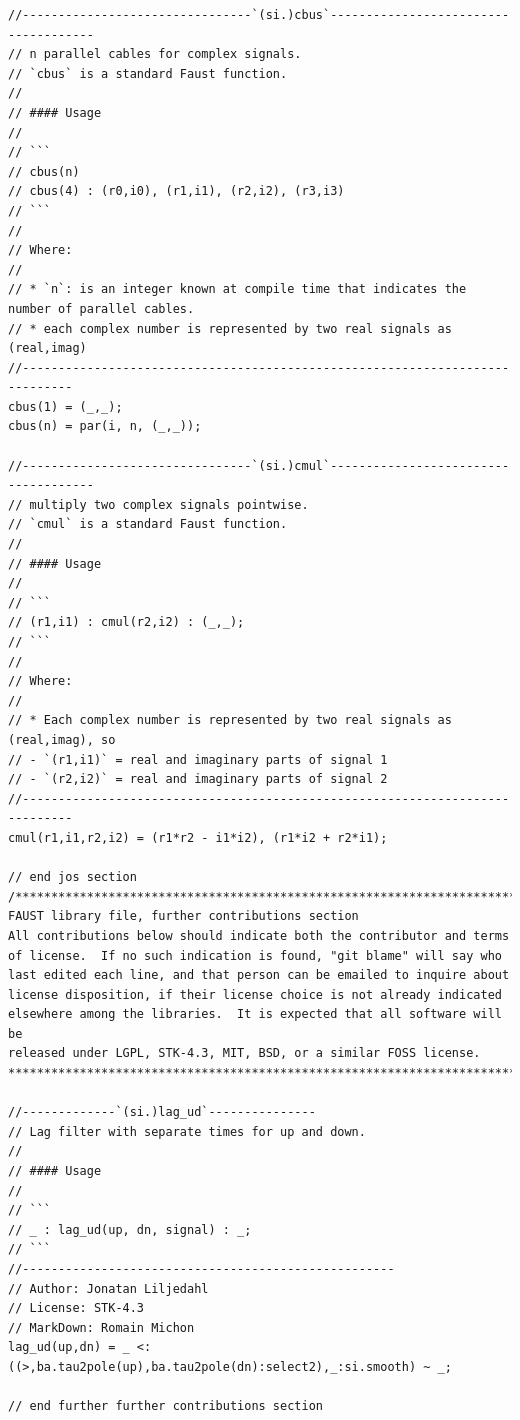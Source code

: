 \documentclass{article}
\begin{document}
\begin{lstlisting}[caption=\texttt{signals.lib}]
//--------------------------------`(si.)cbus`-------------------------------------
// n parallel cables for complex signals.
// `cbus` is a standard Faust function.
//
// #### Usage
//
// ```
// cbus(n)
// cbus(4) : (r0,i0), (r1,i1), (r2,i2), (r3,i3)
// ```
//
// Where:
//
// * `n`: is an integer known at compile time that indicates the number of parallel cables.
// * each complex number is represented by two real signals as (real,imag)
//-----------------------------------------------------------------------------
cbus(1) = (_,_);
cbus(n) = par(i, n, (_,_));

//--------------------------------`(si.)cmul`-------------------------------------
// multiply two complex signals pointwise.
// `cmul` is a standard Faust function.
//
// #### Usage
//
// ```
// (r1,i1) : cmul(r2,i2) : (_,_);
// ```
//
// Where:
//
// * Each complex number is represented by two real signals as (real,imag), so
// - `(r1,i1)` = real and imaginary parts of signal 1
// - `(r2,i2)` = real and imaginary parts of signal 2
//-----------------------------------------------------------------------------
cmul(r1,i1,r2,i2) = (r1*r2 - i1*i2), (r1*i2 + r2*i1);

// end jos section
/************************************************************************
FAUST library file, further contributions section
All contributions below should indicate both the contributor and terms
of license.  If no such indication is found, "git blame" will say who
last edited each line, and that person can be emailed to inquire about
license disposition, if their license choice is not already indicated
elsewhere among the libraries.  It is expected that all software will be
released under LGPL, STK-4.3, MIT, BSD, or a similar FOSS license.
************************************************************************/

//-------------`(si.)lag_ud`---------------
// Lag filter with separate times for up and down.
//
// #### Usage
//
// ```
// _ : lag_ud(up, dn, signal) : _;
// ```
//----------------------------------------------------
// Author: Jonatan Liljedahl
// License: STK-4.3
// MarkDown: Romain Michon
lag_ud(up,dn) = _ <: ((>,ba.tau2pole(up),ba.tau2pole(dn):select2),_:si.smooth) ~ _;

// end further further contributions section
\end{lstlisting}
\end{document}
